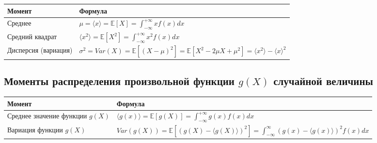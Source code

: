 \documentclass[
  russian,
  letterpaper,
]{scrbook}
\newcounter{none} %
\begin{document}
{\def\LTcaptype{none} %
\begin{longtable}[]{@{}
  >{\centering\arraybackslash}p{}
  >{\centering\arraybackslash}p{}@{}}
\toprule\noalign{}
\begin{minipage}[b]{\linewidth}\centering
Момент
\end{minipage} & \begin{minipage}[b]{\linewidth}\centering
Формула
\end{minipage} \\
\midrule\noalign{}
\endhead
\bottomrule\noalign{}
\endlastfoot
Среднее &
\(\mu=\langle x\rangle=\mathbb{E}[X]=\int_{-\infty}^{+\infty} xf(x)dx\) \\
Средний квадрат &
\(\langle x^2\rangle=\mathbb{E}[X^2]=\int_{-\infty}^{+\infty} x^2 f(x)dx\) \\
Дисперсия (вариация) &
\(\sigma^2=Var(X)=\mathbb{E}\left[(X-\mu)^2\right]=\mathbb{E}\left[X^2-2\mu X+\mu^2\right]=\langle x^2 \rangle-\langle x\rangle^2\) \\
\end{longtable}
}

\subsection{\texorpdfstring{Моменты распределения произвольной функции
\(g(X)\) случайной
величины}{Моменты распределения произвольной функции g(X) случайной величины}}\label{ux43cux43eux43cux435ux43dux442ux44b-ux440ux430ux441ux43fux440ux435ux434ux435ux43bux435ux43dux438ux44f-ux43fux440ux43eux438ux437ux432ux43eux43bux44cux43dux43eux439-ux444ux443ux43dux43aux446ux438ux438-gx-ux441ux43bux443ux447ux430ux439ux43dux43eux439-ux432ux435ux43bux438ux447ux438ux43dux44b}

{\def\LTcaptype{none} %
\begin{longtable}[]{@{}
  >{\centering\arraybackslash}p{}
  >{\centering\arraybackslash}p{}@{}}
\toprule\noalign{}
\begin{minipage}[b]{\linewidth}\centering
Момент
\end{minipage} & \begin{minipage}[b]{\linewidth}\centering
Формула
\end{minipage} \\
\midrule\noalign{}
\endhead
\bottomrule\noalign{}
\endlastfoot
Среднее значение функции \(g(X)\) &
\(\langle g(x)\rangle=\mathbb{E}\left[g(X)\right]=\int_{-\infty}^{+\infty} g(x)f(x)dx\) \\
Вариация функции \(g(X)\) &
\(Var(g(X))=\mathbb{E}\left[(g(X)-\langle g(X)\rangle)^2\right]= \int_{-\infty}^\infty \left(g(x)-\langle g(x)\rangle\right)^2 f(x) dx\) \\
\end{longtable}
}
\end{document}
